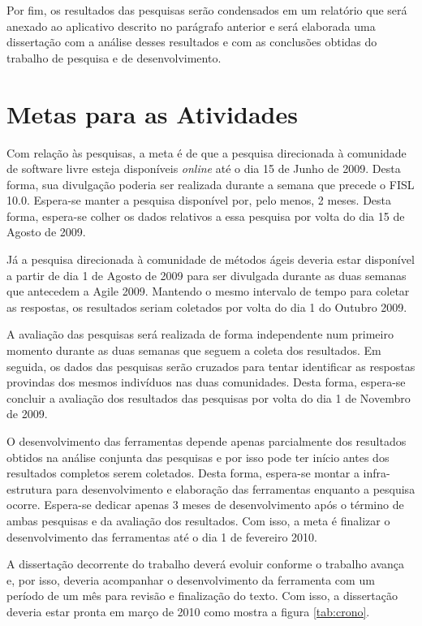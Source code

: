 Por fim, os resultados das pesquisas serão condensados em um relatório
que será anexado ao aplicativo descrito no parágrafo anterior e será
elaborada uma dissertação com a análise desses resultados e com as
conclusões obtidas do trabalho de pesquisa e de desenvolvimento.

\section{Metas para as Atividades}
\label{sec:cronograma}

Com relação às pesquisas, a meta é de que a pesquisa direcionada à
comunidade de software livre esteja disponíveis \emph{online} até o
dia 15 de Junho de 2009. Desta forma, sua divulgação poderia ser
realizada durante a semana que precede o FISL 10.0. Espera-se manter a
pesquisa disponível por, pelo menos, 2 meses. Desta forma, espera-se
colher os dados relativos a essa pesquisa por volta do dia 15 de
Agosto de 2009.

Já a pesquisa direcionada à comunidade de métodos ágeis deveria estar
disponível a partir de dia 1 de Agosto de 2009 para ser divulgada
durante as duas semanas que antecedem a Agile 2009. Mantendo o mesmo
intervalo de tempo para coletar as respostas, os resultados seriam
coletados por volta do dia 1 do Outubro 2009.

A avaliação das pesquisas será realizada de forma independente num
primeiro momento durante as duas semanas que seguem a coleta dos
resultados. Em seguida, os dados das pesquisas serão cruzados para
tentar identificar as respostas provindas dos mesmos indivíduos nas
duas comunidades. Desta forma, espera-se concluir a avaliação dos
resultados das pesquisas por volta do dia 1 de Novembro de 2009.

O desenvolvimento das ferramentas depende apenas parcialmente dos
resultados obtidos na análise conjunta das pesquisas e por isso pode
ter início antes dos resultados completos serem coletados. Desta
forma, espera-se montar a infra-estrutura para desenvolvimento e
elaboração das ferramentas enquanto a pesquisa ocorre. Espera-se
dedicar apenas 3 meses de desenvolvimento após o término de ambas
pesquisas e da avaliação dos resultados. Com isso, a meta é finalizar
o desenvolvimento das ferramentas até o dia 1 de fevereiro 2010.

A dissertação decorrente do trabalho deverá evoluir conforme o
trabalho avança e, por isso, deveria acompanhar o desenvolvimento da
ferramenta com um período de um mês para revisão e finalização do
texto. Com isso, a dissertação deveria estar pronta em março de 2010
como mostra a figura \ref{tab:crono}.

